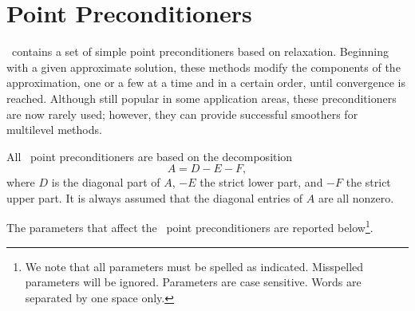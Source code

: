 \section{Point Preconditioners}
\label{sec:point}

\ifpack\ contains a set of simple point preconditioners based on relaxation.
Beginning with a given approximate solution, these methods modify the
components of the approximation, one or a few at a time and in a certain order,
until convergence is reached. Although still popular in some application
areas, these preconditioners are now
rarely used; however, they can provide successful smoothers for multilevel
methods. 

All \ifpack\ point preconditioners are based on the decomposition
\begin{equation}
\label{eq:splitting}
A = D - E - F,
\end{equation}
where $D$ is the diagonal part of $A$, $-E$ the strict lower part, and 
$-F$ the strict upper part. It is always assumed that the diagonal entries of
$A$ are all nonzero.

The parameters that affect the \ifpack\ point preconditioners are reported
below\footnote{We note that all parameters must be spelled as indicated.
  Misspelled parameters will be ignored. Parameters are case sensitive. Words
  are separated by one space only.}.

\smallskip


				 


